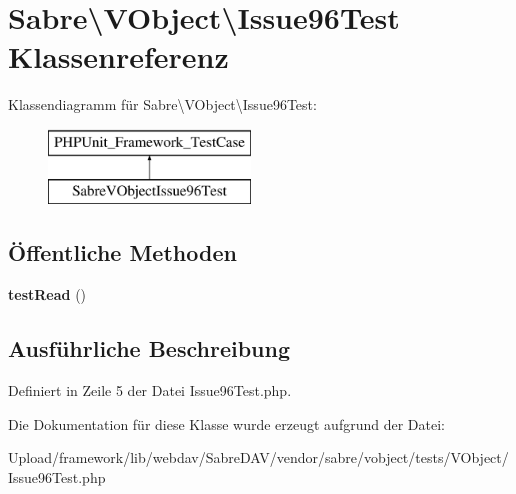 \hypertarget{class_sabre_1_1_v_object_1_1_issue96_test}{}\section{Sabre\textbackslash{}V\+Object\textbackslash{}Issue96\+Test Klassenreferenz}
\label{class_sabre_1_1_v_object_1_1_issue96_test}
Klassendiagramm für Sabre\textbackslash{}V\+Object\textbackslash{}Issue96\+Test\+:\begin{figure}[H]
\begin{center}
\leavevmode
\includegraphics[height=2.000000cm]{class_sabre_1_1_v_object_1_1_issue96_test}
\end{center}
\end{figure}
\subsection*{Öffentliche Methoden}
\begin{DoxyCompactItemize}
\item 
\mbox{\label{class_sabre_1_1_v_object_1_1_issue96_test_ac429da747e6c80f481b4ebc0c18d6145}} 
{\bfseries test\+Read} ()
\end{DoxyCompactItemize}


\subsection{Ausführliche Beschreibung}


Definiert in Zeile 5 der Datei Issue96\+Test.\+php.



Die Dokumentation für diese Klasse wurde erzeugt aufgrund der Datei\+:\begin{DoxyCompactItemize}
\item 
Upload/framework/lib/webdav/\+Sabre\+D\+A\+V/vendor/sabre/vobject/tests/\+V\+Object/Issue96\+Test.\+php\end{DoxyCompactItemize}
